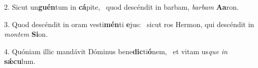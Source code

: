 2. Sicut un\textbf{guén}tum in \textbf{cá}pite, \ast\  quod descéndit in barbam, \textit{bar}\textit{bam} \textbf{A}\textbf{a}ron.\

3. Quod descéndit in oram vesti\textbf{mén}ti \textbf{e}jus: \ast\  sicut ros Hermon, qui descéndit in \textit{mon}\textit{tem} \textbf{Si}on.\

4. Quóniam illic mandávit Dóminus bene\textbf{dic}ti\textbf{ó}nem, \ast\  et vitam us\textit{que} \textit{in} \textbf{sǽ}\textbf{cu}lum.\

